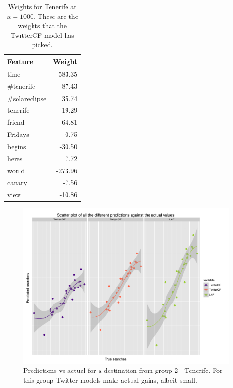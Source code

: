 \documentclass[minf,frontabs,twoside,singlespacing,parskip]{infthesis}
\begin{document}
\begin{table}
\begin{center}
\begin{tabular}{l | r}
Feature & Weight \\
\hline
time & 583.35 \\
\#tenerife & -87.43 \\
\#solareclipse & 35.74\\
tenerife & -19.29\\
friend & 64.81\\
Fridays & 0.75\\
begins & -30.50\\
heres & 7.72\\
would & -273.96\\
canary & -7.56\\
view & -10.86 \\
\end{tabular}
\end{center}
\caption{Weights for Tenerife at $\alpha=1000$. These are the weights that the TwitterCF model has picked.}
\end{table}

\begin{figure}[]
\begin{center}
\includegraphics[scale=0.5]{plots/Tenerife}
\end{center}
\caption{Predictions vs actual for a destination from group 2 - Tenerife. For this group Twitter models make actual gains, albeit small.}
\end{figure}
\end{document}
